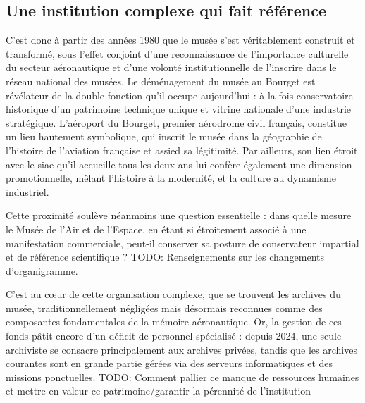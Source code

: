 \subsection{Une institution complexe qui fait référence}
C’est donc à partir des années 1980 que le musée s’est véritablement construit et transformé, sous l’effet conjoint d’une reconnaissance de l’importance culturelle du secteur aéronautique et d’une volonté institutionnelle de l'inscrire dans le réseau national des musées. Le déménagement du musée au Bourget est révélateur de la double fonction qu’il occupe aujourd’hui : à la fois conservatoire historique d’un patrimoine technique unique et vitrine nationale d’une industrie stratégique. L’aéroport du Bourget, premier aérodrome civil français, constitue un lieu hautement symbolique, qui inscrit le musée dans la géographie de l'histoire de l'aviation française et assied sa légitimité. Par ailleurs, son lien étroit avec le \ac{siae} qu'il accueille tous les deux ans lui confère également une dimension promotionnelle, mêlant l’histoire à la modernité, et la culture au dynamisme industriel.

Cette proximité soulève néanmoins une question essentielle : dans quelle mesure le Musée de l’Air et de l’Espace, en étant si étroitement associé à une manifestation commerciale, peut-il conserver sa posture de conservateur impartial et de référence scientifique ? TODO: Renseignements sur les changements d'organigramme.

C'est au cœur de cette organisation complexe, que se trouvent les archives du musée, traditionnellement négligées mais désormais reconnues comme des composantes fondamentales de la mémoire aéronautique. Or, la gestion de ces fonds pâtit encore d’un déficit de personnel spécialisé : depuis 2024, une seule archiviste se consacre principalement aux archives privées, tandis que les archives courantes sont en grande partie gérées via des serveurs informatiques et des missions ponctuelles. TODO: Comment pallier ce manque de ressources humaines et mettre en valeur ce patrimoine/garantir la pérennité de l'institution

